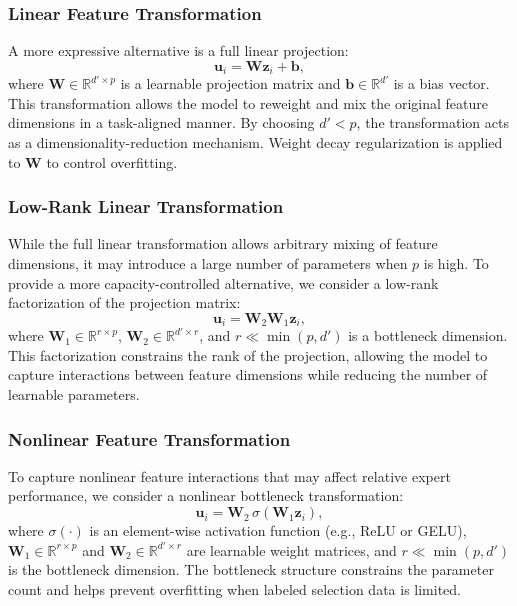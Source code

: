 \documentclass[journal]{IEEEtran}
\begin{document}
    \subsubsection{Linear Feature Transformation}
    A more expressive alternative is a full linear projection:
      \[
    \mathbf{u}_i = \mathbf{W}\mathbf{z}_i + \mathbf{b},
    \]
    where $\mathbf{W}\in \mathbb{R}^{d' \times p}$ is a learnable projection matrix
    and $\mathbf{b}\in \mathbb{R}^{d'}$ is a bias vector. This transformation
    allows the model to reweight and mix the original feature dimensions in a
    task-aligned manner. By choosing $d' < p$, the transformation acts as a
    dimensionality-reduction mechanism. Weight decay regularization is applied to
    $\mathbf{W}$ to control overfitting.

    \subsubsection{Low-Rank Linear Transformation}

    While the full linear transformation allows arbitrary mixing of feature
    dimensions, it may introduce a large number of parameters when $p$ is high.
    To provide a more capacity-controlled alternative, we consider a low-rank factorization
    of the projection matrix:
    \[
        \mathbf{u}_{i}= \mathbf{W}_{2}\mathbf{W}_{1}\mathbf{z}_{i},
    \]
    where $\mathbf{W}_{1}\in \mathbb{R}^{r \times p}$, $\mathbf{W}_{2}\in \mathbb{R}
    ^{d' \times r}$, and $r \ll \min(p,d')$ is a bottleneck dimension. This factorization
    constrains the rank of the projection, allowing the model to capture
    interactions between feature dimensions while reducing the number of
    learnable parameters.

    \subsubsection{Nonlinear Feature Transformation}

    To capture nonlinear feature interactions that may affect relative expert performance,
    we consider a nonlinear bottleneck transformation:
    \[
        \mathbf{u}_{i}= \mathbf{W}_{2}\, \sigma(\mathbf{W}_{1}\mathbf{z}_{i}),
    \]
    where $\sigma(\cdot)$ is an element-wise activation function (e.g., ReLU or
    GELU), $\mathbf{W}_{1}\in \mathbb{R}^{r \times p}$ and
    $\mathbf{W}_{2}\in \mathbb{R}^{d' \times r}$ are learnable weight matrices, and
    $r \ll \min(p,d')$ is the bottleneck dimension. The bottleneck structure
    constrains the parameter count and helps prevent overfitting when labeled
    selection data is limited.
\end{document}
